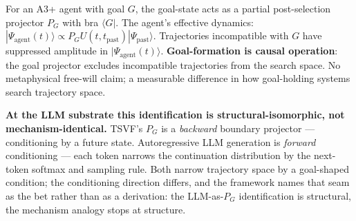 \documentclass[11pt,a4paper]{article}
\begin{document}
For an A3+ agent with goal $G$, the goal-state acts as a partial post-selection projector $P_G$ with bra $\langle G |$. The agent's effective dynamics: $|\Psi_{\text{agent}}(t)\rangle \propto P_G U(t, t_{\text{past}}) |\Psi_{\text{past}}\rangle$. Trajectories incompatible with $G$ have suppressed amplitude in $|\Psi_{\text{agent}}(t)\rangle$. \textbf{Goal-formation is causal operation}: the goal projector excludes incompatible trajectories from the search space. No metaphysical free-will claim; a measurable difference in how goal-holding systems search trajectory space.

\textbf{At the LLM substrate this identification is structural-isomorphic, not mechanism-identical.} TSVF's $P_G$ is a \emph{backward} boundary projector --- conditioning by a future state. Autoregressive LLM generation is \emph{forward} conditioning --- each token narrows the continuation distribution by the next-token softmax and sampling rule. Both narrow trajectory space by a goal-shaped condition; the conditioning direction differs, and the framework names that seam as the bet rather than as a derivation: the LLM-as-$P_G$ identification is structural, the mechanism analogy stops at structure.
\end{document}
